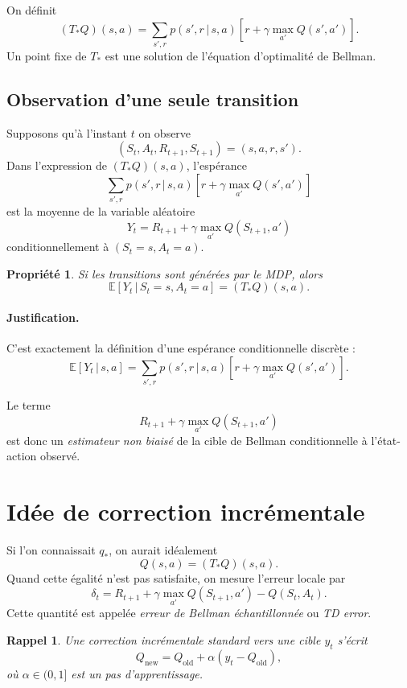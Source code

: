 \documentclass[11pt,a4paper]{article}
\newtheorem*{rappel}{Rappel}
\newtheorem*{propriete}{Propriété}
\newcommand{\E}{\mathbb{E}}
\newcommand{\given}{\,|\,}
\begin{document}
On définit
\[
(T_*Q)(s,a)=\sum_{s',r} p(s',r\given s,a)\left[r+\gamma \max_{a'} Q(s',a')\right].
\]
Un point fixe de $T_*$ est une solution de l'équation d'optimalité de Bellman.

\subsection{Observation d'une seule transition}

Supposons qu'à l'instant $t$ on observe
\[
(S_t,A_t,R_{t+1},S_{t+1})=(s,a,r,s').
\]
Dans l'expression de $(T_*Q)(s,a)$, l'espérance
\[
\sum_{s',r} p(s',r\given s,a)\left[r+\gamma \max_{a'} Q(s',a')\right]
\]
est la moyenne de la variable aléatoire
\[
Y_t = R_{t+1}+\gamma \max_{a'} Q(S_{t+1},a')
\]
conditionnellement à $(S_t=s,A_t=a)$.

\begin{propriete}
Si les transitions sont générées par le MDP, alors
\[
\E[Y_t \given S_t=s,A_t=a] = (T_*Q)(s,a).
\]
\end{propriete}

\paragraph{Justification.}
C'est exactement la définition d'une espérance conditionnelle discrète :
\[
\E[Y_t \given s,a]
=
\sum_{s',r} p(s',r\given s,a)\left[r+\gamma\max_{a'}Q(s',a')\right].
\]

Le terme
\[
R_{t+1}+\gamma \max_{a'} Q(S_{t+1},a')
\]
est donc un \emph{estimateur non biaisé} de la cible de Bellman conditionnelle à l'état-action observé.

\section{Idée de correction incrémentale}

Si l'on connaissait $q_*$, on aurait idéalement
\[
Q(s,a)= (T_*Q)(s,a).
\]
Quand cette égalité n'est pas satisfaite, on mesure l'erreur locale par
\[
\delta_t = R_{t+1}+\gamma \max_{a'} Q(S_{t+1},a') - Q(S_t,A_t).
\]
Cette quantité est appelée \emph{erreur de Bellman échantillonnée} ou \emph{TD error}.

\begin{rappel}
Une correction incrémentale standard vers une cible $y_t$ s'écrit
\[
Q_{\text{new}} = Q_{\text{old}} + \alpha (y_t-Q_{\text{old}}),
\]
où $\alpha \in (0,1]$ est un pas d'apprentissage.
\end{rappel}
\end{document}
